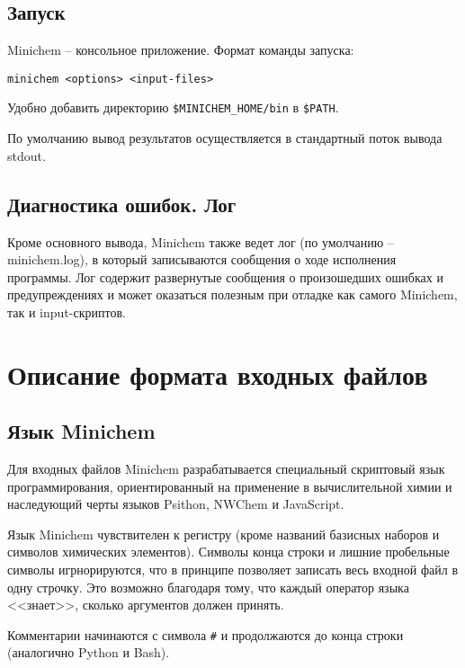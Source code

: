 \documentclass[a4paper]{book}
\begin{document}
\section{Запуск}
Minichem -- консольное приложение. Формат команды запуска:
\begin{lstlisting}
minichem <options> <input-files>
\end{lstlisting}
Удобно добавить директорию \texttt{\$MINICHEM\_HOME/bin} в \texttt{\$PATH}.

По умолчанию вывод результатов осуществляется в стандартный поток вывода stdout.

\section{Диагностика ошибок. Лог}
Кроме основного вывода, Minichem также ведет лог
(по умолчанию -- minichem.log), в который записываются сообщения о ходе исполнения программы. Лог содержит развернутые сообщения о произошедших
ошибках и предупреждениях и может оказаться полезным при отладке как самого Minichem, так и input-скриптов.

\chapter{Описание формата входных файлов}
\section{Язык Minichem}
Для входных файлов Minichem разрабатывается специальный скриптовый язык программирования, ориентированный на применение в вычислительной химии
и наследующий черты языков Psithon, NWChem и JavaScript.

Язык Minichem чувствителен к регистру (кроме названий базисных наборов и символов химических элементов). Символы конца строки и лишние пробельные символы
игрнорируются, что в принципе позволяет записать весь входной файл в одну строчку. Это возможно благодаря тому, что каждый оператор языка <<знает>>, сколько
аргументов должен принять.

Комментарии начинаются с символа \texttt{\#} и продолжаются до конца строки (аналогично Python и Bash).
\end{document}
